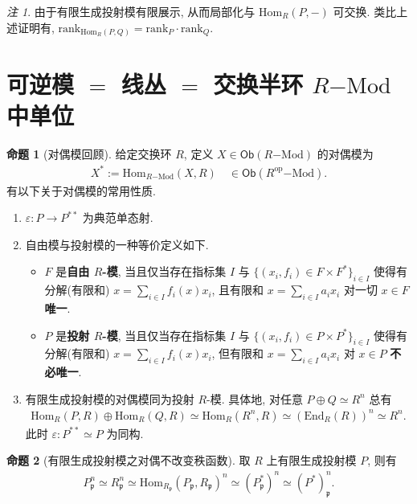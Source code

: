 \documentclass{MainStyle}
\theoremstyle{definition}
\theoremstyle{definition}
\theoremstyle{definition}
\theoremstyle{definition}
\newtheorem{proposition}{命题}
\theoremstyle{definition}
\theoremstyle{definition}
\theoremstyle{definition}
\theoremstyle{remark}
\newtheorem{remark}{注}
\theoremstyle{remark}
\begin{document}
\begin{remark}
    由于有限生成投射模有限展示, 从而局部化与 $\mathrm{Hom}_R(P,-)$ 可交换. 类比上述证明有, $\mathrm{rank}_{\mathrm{Hom}_R(P,Q)}=\mathrm{rank}_P\cdot \mathrm{rank}_Q$.
\end{remark}


\section{可逆模 $=$ 线丛 $=$ 交换半环 $R\mathrm{-Mod}$ 中单位}

\begin{proposition}[对偶模回顾]
    给定交换环 $R$, 定义 $X\in \mathsf{Ob}(R\mathrm{-Mod})$ 的对偶模为
    \begin{align*}
        X^\ast:=\mathrm{Hom}_{R\mathrm{-Mod}}(X,R)\quad \in \mathsf{Ob}(R^{\mathrm{op}}\mathrm{-Mod}).
    \end{align*}
    有以下关于对偶模的常用性质.
    \begin{enumerate}
        \item $\varepsilon: P\to P^{\ast\ast}$ 为典范单态射.
        \item 自由模与投射模的一种等价定义如下.
              \begin{itemize}
                  \item $F$ 是\textbf{自由 $R$-模}, 当且仅当存在指标集 $I$ 与 $\{(x_i,f_i)\in F\times F^\ast\}_{i\in I}$ 使得有分解(有限和) $\displaystyle x=\sum _{i\in I}f_i(x)x_i$, 且有限和 $\displaystyle x=\sum _{i\in I}a_i x_i$ 对一切 $x\in F$ \textbf{唯一}.
                  \item $P$ 是\textbf{投射 $R$-模}, 当且仅当存在指标集 $I$ 与 $\{(x_i,f_i)\in P\times P^\ast\}_{i\in I}$ 使得有分解(有限和) $\displaystyle x=\sum _{i\in I}f_i(x)x_i$, 但有限和 $\displaystyle x=\sum _{i\in I}a_i x_i$ 对 $x\in P$ \textbf{不必唯一}.
              \end{itemize}
        \item 有限生成投射模的对偶模同为投射 $R$-模. 具体地, 对任意 $P\oplus Q\simeq R^n$ 总有
              \begin{align*}
                  \mathrm{Hom}_R(P,R)\oplus \mathrm{Hom}_R(Q,R)\simeq \mathrm{Hom}_R(R^n,R)\simeq (\mathrm{End}_R(R))^n\simeq R^n.
              \end{align*}
              此时 $\varepsilon: P^{\ast\ast}\simeq P$ 为同构.
    \end{enumerate}
\end{proposition}

\begin{proposition}[有限生成投射模之对偶不改变秩函数]
    取 $R$ 上有限生成投射模 $P$, 则有
    \begin{align*}
        P_\mathfrak p^n\simeq R_\mathfrak p^n\simeq \mathrm{Hom}_{R_\mathfrak p}(P_\mathfrak p,R_\mathfrak p)^n\simeq (P^\ast_\mathfrak p)^n\simeq (P^\ast)_\mathfrak p^n.
    \end{align*}
\end{proposition}
\end{document}
